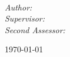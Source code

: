 \documentclass[
12pt, %
oneside, %
english, %
onespacing, %
headsepline, %
]{MastersDoctoralThesis} %
\begin{document}
\begin{titlepage}
\begin{center}
{\huge \bfseries \ttitle}\\[0.4cm] %
 
 \emph{Author: } \authorname \\
 \emph{Supervisor: } \supname \\
 \emph{Second Assessor:} \examname
 

\smallskip

 {\large \today}\\[1cm] %
 \bigskip
 
\vfill
\end{center}
\end{titlepage}




\end{document}

